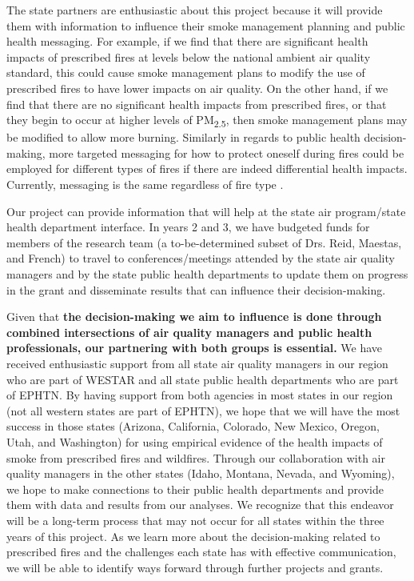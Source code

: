 \documentclass[authoryear]{elsarticle}
\begin{document}
The state partners are enthusiastic about this project because it will provide them with information to influence their smoke management planning and public health messaging. For example, if we find that there are significant health impacts of prescribed fires at levels below the national ambient air quality standard, this could cause smoke management plans to modify the use of prescribed fires to have lower impacts on air quality. On the other hand, if we find that there are no significant health impacts from prescribed fires, or that they begin to occur at higher levels of PM\textsubscript{2.5}, then smoke management plans may be modified to allow more burning. Similarly in regards to public health decision-making, more targeted messaging for how to protect oneself during fires could be employed for different types of fires if there are indeed differential health impacts. Currently, messaging is the same regardless of fire type \citep{EPA2016}. %

Our project can provide information that will help at the state air program/state health department interface. In years 2 and 3, we have budgeted funds for members of the research team (a to-be-determined subset of Drs. Reid, Maestas, and French) to travel to conferences/meetings attended by the state air quality managers and by the state public health departments to update them on progress in the grant and disseminate results that can influence their decision-making. 

Given that \textbf{the decision-making we aim to influence is done through combined intersections of air quality managers and public health professionals, our partnering with both groups is essential.} We have received enthusiastic support from all state air quality managers in our region who are part of WESTAR and all state public health departments who are part of EPHTN. By having support from both agencies in most states in our region (not all western states are part of EPHTN), we hope that we will have the most success in those states (Arizona, California, Colorado, New Mexico, Oregon, Utah, and Washington) for using empirical evidence of the health impacts of smoke from prescribed fires and wildfires. Through our collaboration with air quality managers in the other states (Idaho, Montana, Nevada, and Wyoming), we hope to make connections to their public health departments and provide them with data and results from our analyses. We recognize that this endeavor will be a long-term process that may not occur for all states within the three years of this project. As we learn more about the decision-making related to prescribed fires and the challenges each state has with effective communication, we will be able to identify ways forward through further projects and grants. 
\end{document}
